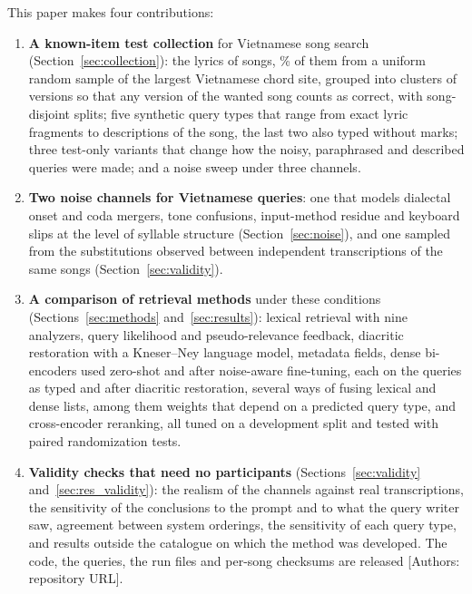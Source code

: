 \documentclass[11pt]{article}
\newcommand{\authornote}[1]{\textcolor{blue!55!black}{\textsf{\small[Authors: #1]}}}
\begin{document}
This paper makes four contributions:
\begin{enumerate}[leftmargin=*,itemsep=2pt]
\item \textbf{A known-item test collection} for Vietnamese song search (Section~\ref{sec:collection}):
the lyrics of \NSongs{} songs, \UniformShare\% of them from a uniform random sample of the largest Vietnamese
chord site, grouped into clusters of versions so that any version of the wanted song counts as correct, with
song-disjoint splits; five synthetic query types that range from exact lyric fragments to descriptions of the
song, the last two also typed without marks; three test-only variants that change how the noisy, paraphrased
and described queries were made; and a noise sweep under three channels.
\item \textbf{Two noise channels for Vietnamese queries}: one that models dialectal onset and coda mergers,
tone confusions, input-method residue and keyboard slips at the level of syllable structure
(Section~\ref{sec:noise}), and one sampled from the substitutions observed between independent transcriptions
of the same songs (Section~\ref{sec:validity}).
\item \textbf{A comparison of retrieval methods} under these conditions (Sections~\ref{sec:methods}
and~\ref{sec:results}): lexical retrieval with nine analyzers, query likelihood and pseudo-relevance feedback,
diacritic restoration with a Kneser--Ney language model, metadata fields, dense bi-encoders used zero-shot and
after noise-aware fine-tuning, each on the queries as typed and after diacritic restoration, several ways of
fusing lexical and dense lists, among them weights that depend on a predicted query type, and cross-encoder
reranking, all tuned on a development split and tested with paired randomization tests.
\item \textbf{Validity checks that need no participants} (Sections~\ref{sec:validity}
and~\ref{sec:res_validity}): the realism of the channels against real transcriptions, the sensitivity of the
conclusions to the prompt and to what the query writer saw, agreement between system orderings, the
sensitivity of each query type, and results outside the catalogue on which the method was developed. The
code, the queries, the run files and per-song checksums are released \authornote{repository URL}.
\end{enumerate}
\end{document}
